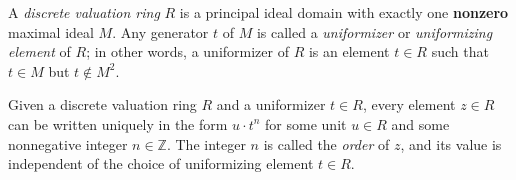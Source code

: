\documentclass[12pt]{article}
\begin{document}
A \emph{discrete valuation ring} $R$ is a principal ideal domain with exactly one \textbf{nonzero} maximal ideal $M$. Any generator $t$ of $M$ is called a \emph{uniformizer} or \emph{uniformizing element} of $R$; in other words, a uniformizer of $R$ is an element $t \in R$ such that $t \in M$ but $t \notin M^2$.

Given a discrete valuation ring $R$ and a uniformizer $t \in R$, every element $z \in R$ can be written uniquely in the form $u \cdot t^n$ for some unit $u \in R$ and some nonnegative integer $n \in \mathbb{Z}$. The integer $n$ is called the \emph{order} of $z$, and its value is independent of the choice of uniformizing element $t \in R$.
\end{document}

